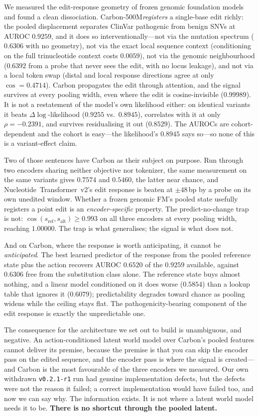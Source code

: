 \documentclass{article}
\newcommand{\sref}{s_{\mathrm{ref}}}
\newcommand{\salt}{s_{\mathrm{alt}}}
\newcommand{\carbon}{Carbon-500M\xspace}
\begin{document}
We measured the edit-response geometry of frozen genomic foundation models and found a clean
dissociation. \carbon \emph{registers} a single-base edit richly: the pooled displacement separates
ClinVar pathogenic from benign SNVs at AUROC $0.9259$, and it does so interventionally---not via the
mutation spectrum ($0.6306$ with no geometry), not via the exact local sequence context
(conditioning on the full trinucleotide context costs $0.0059$), not via the genomic neighbourhood
($0.6392$ from a probe that never sees the edit, with no locus leakage), and not via a local token
swap (distal and local response directions agree at only $\cos=0.4714$). Carbon propagates the edit
through attention, and the signal survives at every pooling width, even where the edit is
cosine-invisible ($0.99989$). It is not a restatement of the model's own likelihood either: on
identical variants it beats $\Delta\log$-likelihood ($0.9255$ vs.\ $0.8945$), correlates with it at
only $\rho=-0.2391$, and survives residualising it out ($0.8529$). The AUROCs are cohort-dependent
and the cohort is easy---the likelihood's $0.8945$ says so---so none of this is a variant-effect
claim.

Two of those sentences have Carbon as their subject on purpose. Run through two encoders sharing
neither objective nor tokenizer, the same measurement on the same variants gives $0.7574$ and
$0.5460$, the latter near chance, and Nucleotide~Transformer~v2's edit response is beaten at
$\pm48$\,bp by a probe on its own unedited window. Whether a frozen genomic FM's pooled state
usefully registers a point edit is an \emph{encoder-specific} property. The predict-no-change trap
is not: $\cos(\sref,\salt)\ge0.993$ on all three encoders at every pooling width, reaching
$1.00000$. The trap is what generalises; the signal is what does not.

And on Carbon, where the response is worth anticipating, it cannot be \emph{anticipated}. The best
learned predictor of the response from the pooled reference state plus the action recovers AUROC
$0.6520$ of the $0.9259$ available, against $0.6306$ free from the substitution class alone. The
reference state buys almost nothing, and a linear model conditioned on it does worse ($0.5854$) than
a lookup table that ignores it ($0.6079$); predictability degrades toward chance as pooling widens
while the ceiling stays flat. The pathogenicity-bearing component of the edit response is exactly
the unpredictable one.

The consequence for the architecture we set out to build is unambiguous, and negative. An
action-conditioned latent world model over Carbon's pooled features cannot deliver its premise,
because the premise is that you can skip the encoder pass on the edited sequence, and the encoder
pass is where the signal is created---and Carbon is the most favourable of the three encoders we
measured. Our own withdrawn \texttt{v0.2.1-r1} run had genuine implementation defects, but the
defects were not the reason it failed; a correct implementation would have failed too, and now we
can say why. The information exists. It is not where a latent world model needs it to be.
\textbf{There is no shortcut through the pooled latent.}
\end{document}
